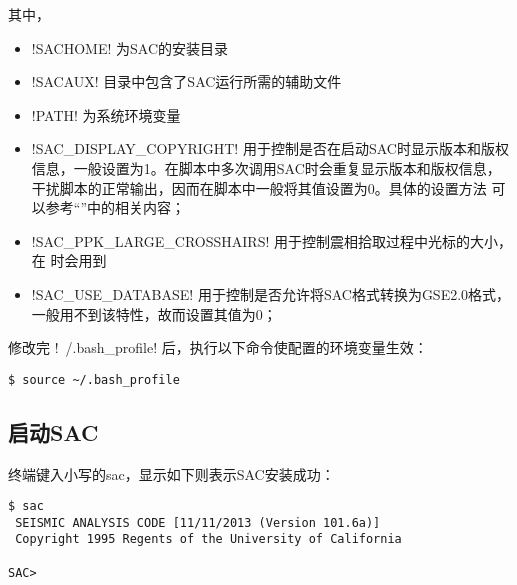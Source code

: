 其中，
\begin{itemize}
\item !SACHOME! 为SAC的安装目录
\item !SACAUX! 目录中包含了SAC运行所需的辅助文件
\item !PATH! 为系统环境变量
\item !SAC_DISPLAY_COPYRIGHT! 用于控制是否在启动SAC时显示版本和版权
    信息，一般设置为1。在脚本中多次调用SAC时会重复显示版本和版权信息，
    干扰脚本的正常输出，因而在脚本中一般将其值设置为0。具体的设置方法
    可以参考``''中的相关内容；
\item !SAC_PPK_LARGE_CROSSHAIRS! 用于控制震相拾取过程中光标的大小，
    在  时会用到
\item !SAC_USE_DATABASE! 用于控制是否允许将SAC格式转换为GSE2.0格式，
    一般用不到该特性，故而设置其值为0；
\end{itemize}

修改完 !~/.bash_profile! 后，执行以下命令使配置的环境变量生效：
\begin{verbatim}
$ source ~/.bash_profile
\end{verbatim}

\subsection{启动SAC}
终端键入小写的sac，显示如下则表示SAC安装成功：
\begin{verbatim}
$ sac
 SEISMIC ANALYSIS CODE [11/11/2013 (Version 101.6a)]
 Copyright 1995 Regents of the University of California

SAC>
\end{verbatim}
